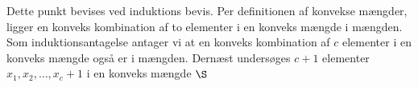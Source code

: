 Dette punkt bevises ved induktions bevis.
Per definitionen af konvekse mængder, ligger en konveks kombination af to elementer i en konveks mængde i mængden.
Som induktionsantagelse antager vi at en konveks kombination af $c$ elementer i en konveks mængde også er i mængden. Dernæst undersøges $c+1$ elementer $x_1,x_2,\ldots,x_c+1$ i en konveks mængde $\S$